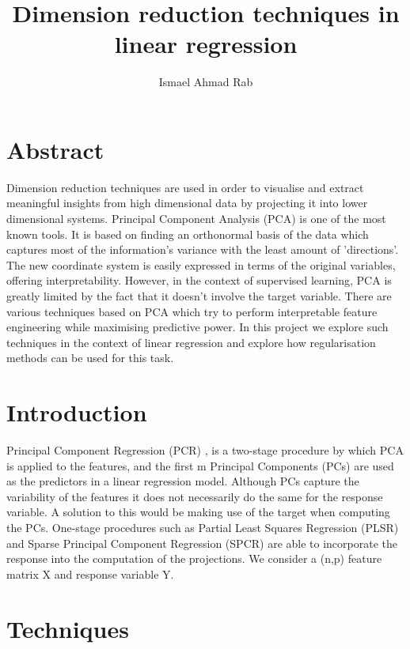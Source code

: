 \documentclass{article}
\title{Dimension reduction techniques in linear regression}
\author{Ismael Ahmad Rab}
\begin{document}
\maketitle


\section*{Abstract}

Dimension reduction techniques are used in order to visualise and extract meaningful insights from high dimensional data by projecting it into lower dimensional systems. Principal Component Analysis (PCA) is one of the most known tools. It is based on finding an orthonormal basis of the data which captures most of the information's variance with the least amount of 'directions'. The new coordinate system is easily expressed in terms of the original variables, offering interpretability. However, in the context of supervised learning, PCA is greatly limited by the fact that it doesn't involve the target variable. There are various techniques based on PCA which try to perform interpretable feature engineering while maximising predictive power. In this project we explore such techniques in the context of linear regression and explore how regularisation methods can be used for this task.

\section{Introduction}

Principal Component Regression (PCR) \cite{Massy1965}, is a two-stage procedure by which PCA is applied to the features, and the first m Principal Components (PCs) are used as the predictors in a linear regression model. Although PCs capture the variability of the features it does not necessarily do the same for the response variable. A solution to this would be making use of the target when computing the PCs. One-stage procedures such as Partial Least Squares Regression (PLSR) \cite{Wold1966} and Sparse Principal Component Regression (SPCR) \cite{SPCR2018} are able to incorporate the response into the computation of the projections. We consider a (n,p) feature matrix X and response variable Y.

\section{Techniques}
\end{document}
